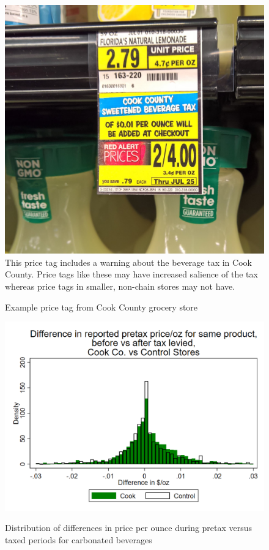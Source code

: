 \documentclass[12pt]{article}
\begin{document}
\begin{figure}[t]\centering
\caption{Example price tag from Cook County grocery store} \label{pricetag}
	\includegraphics[width = \textwidth]{../figures/pricetag.jpg}
	\footnotesize This price tag includes a warning about the beverage tax in Cook County. Price tags like these may have increased salience of the tax whereas price tags in smaller, non-chain stores may not have.
\end{figure}

\clearpage
\begin{figure}[t]\centering
	\includegraphics[width = \textwidth]{../figures/ppozdiff.png}\label{pricediff}
	\caption{Distribution of differences in price per ounce during pretax versus taxed periods for carbonated beverages}
\end{figure}
\end{document}
